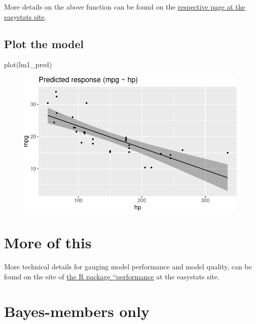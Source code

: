 \documentclass[
  letterpaper,
  DIV=11,
  numbers=noendperiod]{scrreprt}
\newenvironment{Shaded}{\begin{snugshade}}{\end{snugshade}}
\newcommand{\FunctionTok}[1]{\textcolor[rgb]{0.28,0.35,0.67}{#1}}
\newcommand{\NormalTok}[1]{\textcolor[rgb]{0.00,0.23,0.31}{#1}}
\theoremstyle{definition}
\theoremstyle{definition}
\theoremstyle{remark}
\begin{document}
More details on the above function can be found on the
\href{https://easystats.github.io/modelbased/reference/estimate_expectation.html\#functions-for-estimating-predicted-values-and-uncertainty}{respective
page at the easystats site}.

\hypertarget{plot-the-model}{%
\subsection{Plot the model}\label{plot-the-model}}

\begin{Shaded}
\begin{Highlighting}[]
\FunctionTok{plot}\NormalTok{(lm1\_pred)}
\end{Highlighting}
\end{Shaded}

\begin{figure}[H]

{\centering \includegraphics{./regression1_files/figure-pdf/plot-lm1-pred-1.pdf}

}

\end{figure}

\hypertarget{more-of-this}{%
\section{More of this}\label{more-of-this}}

More technical details for gauging model performance and model quality,
can be found on the site of
\href{https://easystats.github.io/performance/}{the R package
``performance} at the easystats site.

\hypertarget{bayes-members-only}{%
\section{Bayes-members only}\label{bayes-members-only}}
\end{document}
